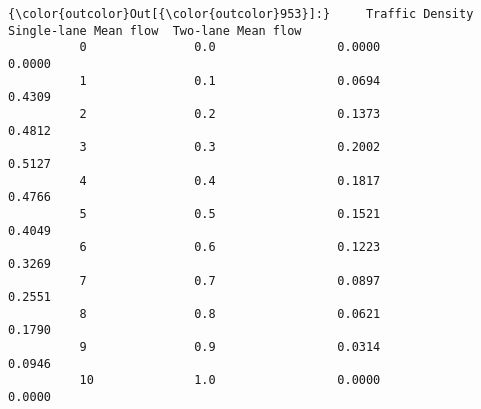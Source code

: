 \documentclass[11pt]{article}
\begin{document}
\begin{Verbatim}[commandchars=\\\{\}]
{\color{outcolor}Out[{\color{outcolor}953}]:}     Traffic Density  Single-lane Mean flow  Two-lane Mean flow
          0               0.0                 0.0000              0.0000
          1               0.1                 0.0694              0.4309
          2               0.2                 0.1373              0.4812
          3               0.3                 0.2002              0.5127
          4               0.4                 0.1817              0.4766
          5               0.5                 0.1521              0.4049
          6               0.6                 0.1223              0.3269
          7               0.7                 0.0897              0.2551
          8               0.8                 0.0621              0.1790
          9               0.9                 0.0314              0.0946
          10              1.0                 0.0000              0.0000
\end{Verbatim}
            
\end{document}

